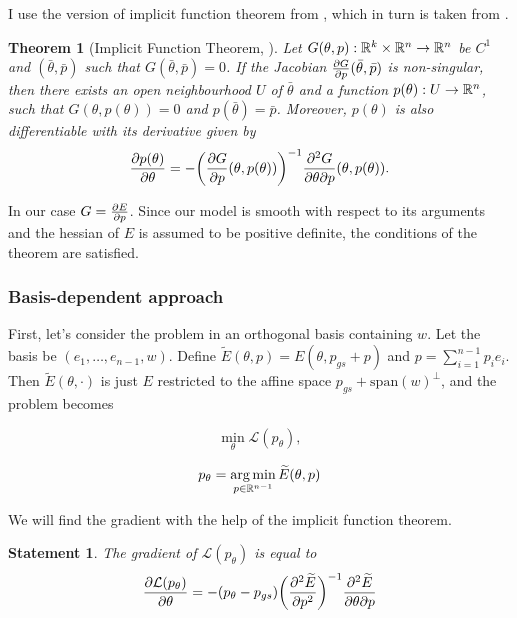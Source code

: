 \documentclass[a4paper,10.5pt]{report}
\newtheorem{theorem}{Theorem}
\newtheorem{statement}{Statement}
\begin{document}
I use the version of implicit function theorem from \cite{zucchet2022beyond}, which in turn is taken from \cite{dontchev2009implicit}.
\begin{theorem}[Implicit Function Theorem, \cite{zucchet2022beyond} ]
Let $G(\theta, p): \mathbb{R}^k \times \mathbb{R}^n \to \mathbb{R}^n$ be $C^1$ and $(\bar{\theta}, \bar{p})$ such that $G(\bar{\theta},\bar{p})=0$. If the Jacobian
$\frac{\partial G}{\partial p}(\bar{\theta},\bar{p})$ is non-singular, then there exists an open neighbourhood $U$ of $\bar{\theta} $ and a function $p(\theta):U \to \mathbb{R}^n$, such that $G(\theta, p(\theta)) = 0$ and $p(\bar{\theta}) = \bar{p}$. Moreover, $p(\theta)$ is also differentiable with
its derivative given by
\begin{equation}
\frac{\partial p(\theta)}{\partial \theta}= - \bigg(\frac{\partial G}{\partial p}(\theta, p(\theta))\bigg)^{-1} \frac{\partial^2 G}{\partial \theta \partial p}(\theta, p(\theta)).
\end{equation}

\end{theorem}
In our case $G = \frac{\partial E}{\partial p}$. Since our model is smooth with respect to its arguments and the hessian of $E$ is assumed to be positive definite, the conditions of the theorem are satisfied.


\subsubsection{Basis-dependent approach}

First, let's consider the problem in an orthogonal basis containing $w$. Let the basis be $(e_1,\ldots, e_{n-1}, w)$. Define $\widetilde{E}(\theta, p) = E(\theta, p_{gs}+ p)$ and $p = \sum_{i=1}^{n-1} p_i e_i$. Then $\widetilde E(\theta, \cdot)$ is just $E$ restricted to the affine space $p_{gs}+\text{span}(w)^\perp$, and the problem becomes

\begin{equation}
  \min_\theta \mathcal{L}(p_\theta),
\end{equation}

\begin{equation}
 p_\theta = \operatorname*{arg\,min}_{p\in \mathbb{R}^{n-1}} \widetilde{E}(\theta, p)
\end{equation}

We will find the gradient with the help of the implicit function theorem.

\begin{statement}
The gradient of $\mathcal{L}(p_\theta)$ is equal to
 \begin{equation}
 \frac{\partial \mathcal{L}(p_\theta)}{\partial \theta} = -(p_\theta - p_{gs}) \bigg(\frac{\partial^2  \widetilde{E}}{\partial p^2}\bigg)^{-1}  \frac{\partial^2  \widetilde{E}}{\partial \theta \partial p}
\end{equation}
\end{statement}
\end{document}
